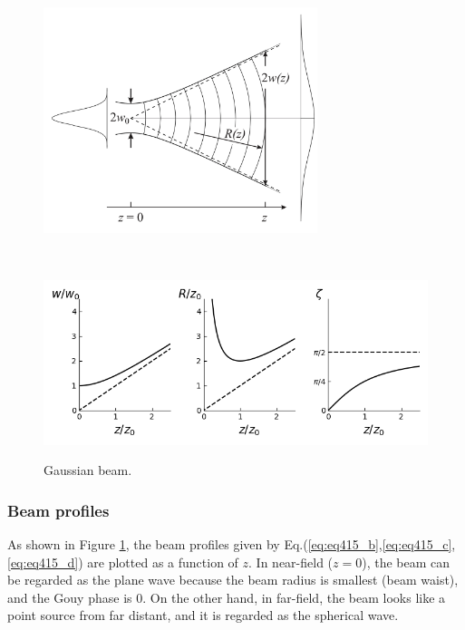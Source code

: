 \begin{figure}[p]
  \begin{minipage}{14cm}
    \centering    
    \includegraphics[width=8cm]{./img_chap4/img415a.png}
    \label{img:img415a}
  \end{minipage}\\
  \begin{minipage}{14cm}
    \centering        
    \includegraphics[width=14cm]{./img_chap4/img415.png}
    \label{img:img415}    
  \end{minipage}
  \caption{Gaussian beam.}
\end{figure}

\subsubsection{Beam profiles}
As shown in Figure \ref{img:img415}, the beam profiles given by Eq.(\ref{eq:eq415_b},\ref{eq:eq415_c},\ref{eq:eq415_d}) are plotted as a function of $z$. In near-field ($z=0$), the beam can be regarded as the plane wave because the beam radius is smallest (beam waist), and the Gouy phase is 0. On the other hand, in far-field, the beam looks like a point source from far distant, and it is regarded as the spherical wave.

